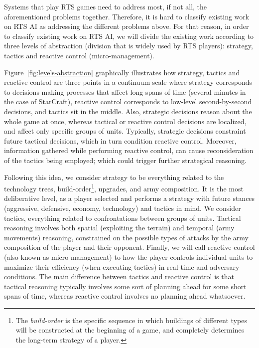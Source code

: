 \documentclass[journal]{IEEEtran}
\begin{document}
Systems that play RTS games need to address most, if not all, the aforementioned problems together. Therefore, it is hard to classify existing work on RTS AI as addressing the different problems above. For that reason, in order to classify existing work on RTS AI, we will divide the existing work according to three levels of abstraction (division that is widely used by RTS players): strategy, tactics and reactive control (micro-management). 

Figure~\ref{fig:levels-abstraction} graphically illustrates how strategy, tactics and reactive control are three points in a continuum scale where strategy corresponds to decisions making processes that affect long spans of time (several minutes in the case of StarCraft), reactive control corresponds to low-level second-by-second decisions, and tactics sit in the middle. Also, strategic decisions reason about the whole game at once, whereas tactical or reactive control decisions are localized, and affect only specific groups of units. Typically, strategic decisions constraint future tactical decisions, which in turn condition reactive control. Moreover, information gathered while performing reactive control, can cause reconsideration of the tactics being employed; which could trigger further strategical reasoning.

Following this idea, we consider strategy to be everything related to the technology trees, build-order\footnote{The {\em build-order} is the specific sequence in which buildings of different types will be constructed at the beginning of a game, and completely determines the long-term strategy of a player.}, upgrades, and army composition. It is the most deliberative level, as a player selected and performs a strategy with future stances (aggressive, defensive, economy, technology) and tactics in mind. We consider tactics, everything related to confrontations between groups of units. Tactical reasoning involves both spatial (exploiting the terrain) and temporal (army movements) reasoning, constrained on the possible types of attacks by the army composition of the player and their opponent. Finally, we will call reactive control (also known as micro-management) to how the player controls individual units to maximize their efficiency (when executing tactics) in real-time and adversary conditions. The main difference between tactics and reactive control is that tactical reasoning typically involves some sort of planning ahead for some short spans of time, whereas reactive control involves no planning ahead whatsoever.
\end{document}
